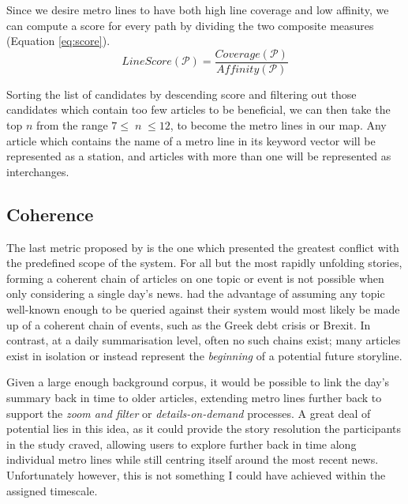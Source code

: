 Since we desire metro lines to have both high line coverage and low affinity, we can compute a score for every path by dividing the two composite measures (Equation \ref{eq:score}).
\begin{equation}
	LineScore(\mathcal{P}) = \frac{Coverage(\mathcal{P})}{Affinity(\mathcal{P})}
	\label{eq:score}
\end{equation}

Sorting the list of candidates by descending score and filtering out those candidates which contain too few articles to be beneficial, we can then take the top $n$ from the range $7 \leq\;n\;\leq 12$, to become the metro lines in our map. Any article which contains the name of a metro line in its keyword vector will be represented as a station, and articles with more than one will be represented as interchanges.

\subsection{Coherence}
The last metric proposed by \citeauthor{GeneratingInformationMaps} is the one which presented the greatest conflict with the predefined scope of the system. For all but the most rapidly unfolding stories, forming a coherent chain of articles on one topic or event is not possible when only considering a single day's news. \citeauthor{GeneratingInformationMaps} had the advantage of assuming any topic well-known enough to be queried against their system would most likely be made up of a coherent chain of events, such as the Greek debt crisis or Brexit. In contrast, at a daily summarisation level, often no such chains exist; many articles exist in isolation or instead represent the \textit{beginning} of a potential future storyline. 

Given a large enough background corpus, it would be possible to link the day's summary back in time to older articles, extending metro lines further back to support the \textit{zoom and filter} or \textit{details-on-demand} processes. A great deal of potential lies in this idea, as it could provide the story resolution the participants in the \cite{anewmodelfornews} study craved, allowing users to explore further back in time along individual metro lines while still centring itself around the most recent news. Unfortunately however, this is not something I could have achieved within the assigned timescale. 


